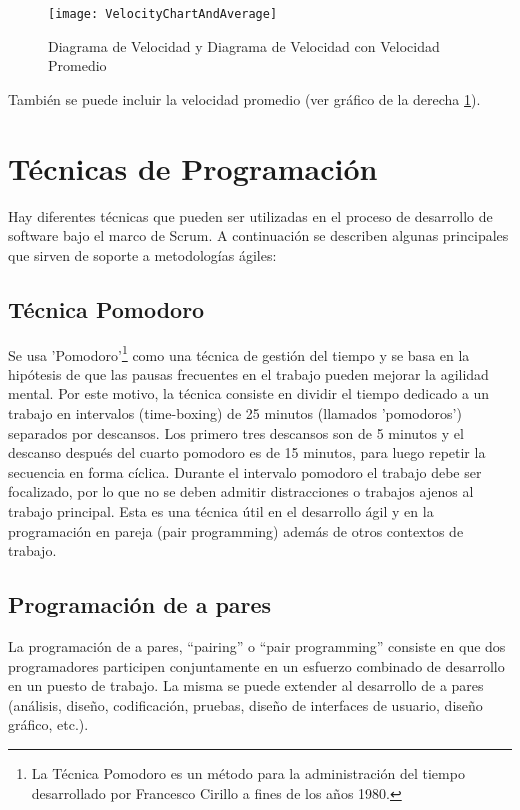 \begin{figure}[h]
  \centering
  \texttt{[image: VelocityChartAndAverage]}
  \caption{Diagrama de Velocidad y Diagrama de Velocidad con Velocidad Promedio}
  \centering
  \label{fig:VelocityChartAndAverage} %
\end{figure}

También se puede incluir la velocidad promedio (ver gráfico de la derecha \ref{fig:VelocityChartAndAverage}).

\newpage
\section{Técnicas de Programación}

Hay diferentes técnicas que pueden ser utilizadas en el proceso de desarrollo de software bajo el marco de Scrum. A continuación se describen algunas principales que sirven de soporte a metodologías ágiles:

\subsection{Técnica Pomodoro}

Se usa 'Pomodoro'\footnote{La Técnica Pomodoro es un método para la administración del tiempo desarrollado por Francesco Cirillo a fines de los años 1980\cite{Cirillo-Francesco-1980}.} como una técnica de gestión del tiempo y se basa en la hipótesis de que las pausas frecuentes en el trabajo pueden mejorar la agilidad mental. Por este motivo, la técnica consiste en dividir el tiempo dedicado a un trabajo en intervalos (time-boxing) de 25 minutos (llamados 'pomodoros') separados por descansos. Los primero tres descansos son de 5 minutos y el descanso después del cuarto pomodoro es de 15 minutos, para luego repetir la secuencia en forma cíclica. Durante el intervalo pomodoro el trabajo debe ser focalizado, por lo que no se deben admitir distracciones o trabajos ajenos al trabajo principal. 
Esta es una técnica útil en el desarrollo ágil y en la programación en pareja (pair programming) además de otros contextos de trabajo.

\subsection{Programación de a pares}

La programación de a pares, “pairing” o “pair programming” consiste en que dos programadores participen conjuntamente en un esfuerzo combinado de desarrollo en un puesto de trabajo. La misma se puede extender al desarrollo de a pares (análisis, diseño, codificación, pruebas, diseño de interfaces de usuario, diseño gráfico, etc.).

